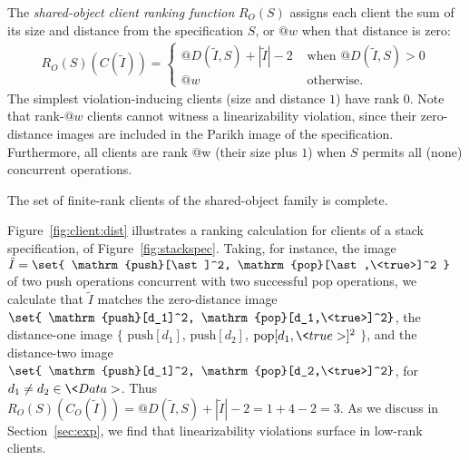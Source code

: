 The \emph{shared-object client ranking function} $R_O(S)$ assigns each client
the sum of its size and distance from the specification $S$, or $@w$ when that
distance is zero:
\begin{align*}
  R_O(S)( C(\tilde{I}) ) = \left\{
  \begin{array}{ll}
    @D(\tilde{I},S) + |\tilde{I}| - 2
    & \text{ when } @D(\tilde{I},S) > 0 \\
    @w 
    & \text{ otherwise. }
  \end{array}
  \right.
\end{align*}
The simplest violation-inducing clients (\ie size and distance $1$) have rank
$0$. Note that rank-$@w$ clients cannot witness a linearizability violation,
since their zero-distance images are included in the Parikh image of the
specification. Furthermore, all clients are rank @w (\resp their size plus $1$)
when $S$ permits all (\resp none) concurrent operations.


\begin{lemma}
  The set of finite-rank clients of the shared-object family is complete.
\end{lemma}

Figure~\ref{fig:client:dist} illustrates a ranking calculation for clients of a
stack specification, \eg of Figure~\ref{fig:stackspec}. Taking, for instance,
the image $\tilde{I} = \set{ \mathrm{push}[\ast]^2,
\mathrm{pop}[\ast,\<true>]^2 }$ of two push operations concurrent with two
successful pop operations, we calculate that $\tilde{I}$ matches the
zero-distance image $\set{ \mathrm{push}[d_1]^2, \mathrm{pop}[d_1,\<true>]^2}$,
the distance-one image $\{$ $\mathrm{push}[d_1]$, $\mathrm{push}[d_2]$,
$\mathrm{pop}[d_1,\<true>]^2$ $\}$, and the distance-two image $\set{
\mathrm{push}[d_1]^2, \mathrm{pop}[d_2,\<true>]^2}$, for $d_1 \neq d_2 \in
\<Data>$. Thus $R_O(S)(C_O(\tilde{I})) = @D(\tilde{I},S) + |\tilde{I}| - 2 = 1
+ 4 - 2 = 3$. As we discuss in Section~\ref{sec:exp}, we find that
linearizability violations surface in low-rank clients.


